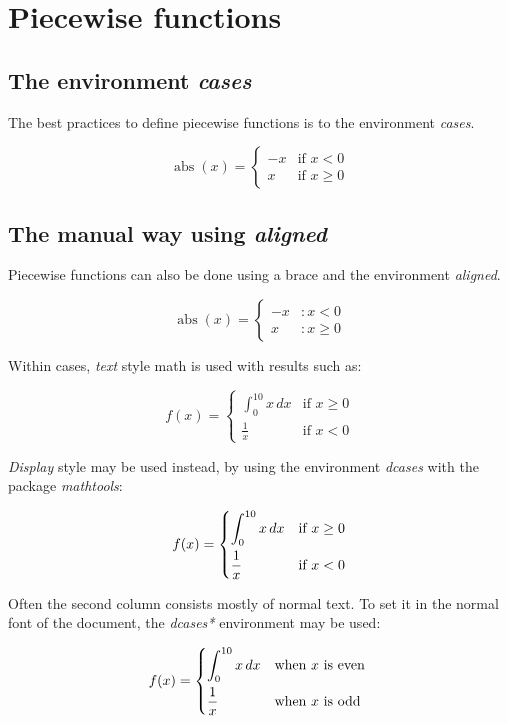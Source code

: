 \documentclass{article}
\begin{document}
\section*{Piecewise functions}

\subsection*{The environment \emph{cases}}

The best practices to define piecewise functions is to the environment \emph{cases}.

\[
	\operatorname{abs}(x)=
	\begin{cases}
		-x	& \text{if } x < 0 \\
		x	& \text{if } x \ge 0
	\end{cases}
\]

\subsection*{The manual way using \emph{aligned}}

Piecewise functions can also be done using a brace and the environment \emph{aligned}.

\[
	\operatorname{abs}(x)=
	\left\{
	\begin{aligned}
		-x	& : x < 0 \\
		x	& : x \ge 0
	\end{aligned}
	\right.
\]

Within cases, \emph{text} style math is used with results such as:

\[
	f(x)=
	\begin{cases}
		\int_{0}^{10} x\, dx & \text{if } x \ge 0 \\
		\frac{1}{x} & \text{if } x < 0
	\end{cases}
\]

\emph{Display} style may be used instead, by using the environment \emph{dcases} with the package \emph{mathtools}:

\[
	f(x)=
	\begin{dcases}
		\int_{0}^{10} x\, dx & \text{if } x \ge 0 \\
		\frac{1}{x} & \text{if } x < 0
	\end{dcases}
\]

Often the second column consists mostly of normal text. To set it in the normal font of the document, the \emph{dcases*} environment may be used:

\[
	f(x)=
	\begin{dcases*}
		\int_{0}^{10} x\, dx & when $x$ is even \\
		\frac{1}{x} & when $x$ is odd
	\end{dcases*}
\]
\end{document}
